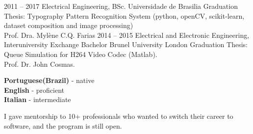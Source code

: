 \documentclass[9pt]{developercv} %
\begin{document}

\begin{entrylist}
	\entry
		{2011 -- 2017}
		{Electrical Engineering, BSc.}
		{Universidade de Brasilia}
		{Graduation Thesis: Typography Pattern Recognition System (python, openCV, scikit-learn, dataset composition and image processing)\\
Prof. Dra. Mylène C.Q. Farias}
	\entry
		{2014 -- 2015}
		{Electrical and Electronic Engineering, Interuniversity Exchange Bachelor}
		{Brunel University London}
		{Graduation Thesis: Queue Simulation for H264 Video Codec (Matlab).\\
Prof. Dr. John Cosmas.}
\end{entrylist}


\begin{minipage}[t]{0.5\textwidth}
	\vspace{-\baselineskip} %

	
	\textbf{Portuguese(Brazil)} - native\\
	\textbf{English} - proficient\\
	\textbf{Italian} - intermediate
\end{minipage}
\hfill
\begin{minipage}[t]{0.5\textwidth}
	\vspace{-\baselineskip} %
	
	
	I gave mentorship to 10+ professionals who wanted to switch their career to software, and the program is still open. 
\end{minipage}

\end{document}
